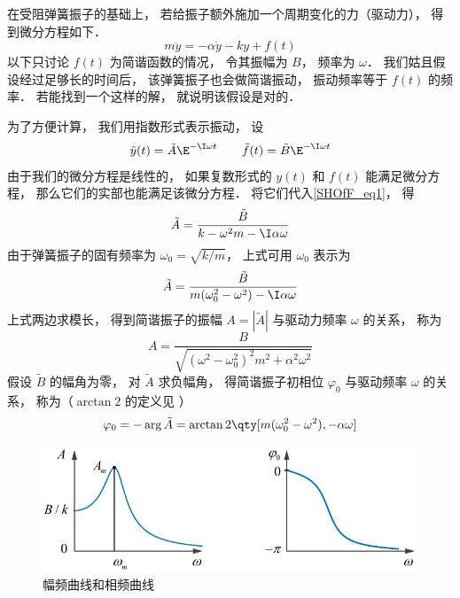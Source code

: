 

在受阻弹簧振子的基础上， 若给振子额外施加一个周期变化的力（驱动力）， 得到微分方程如下．
\begin{equation}\label{SHOfF_eq1}
m\ddot y = -\alpha \dot y - ky + f(t)
\end{equation}
以下只讨论 $f(t)$ 为简谐函数的情况， 令其振幅为 $B$， 频率为 $\omega$． 我们姑且假设经过足够长的时间后， 该弹簧振子也会做简谐振动， 振动频率等于 $f(t)$ 的频率． 若能找到一个这样的解， 就说明该假设是对的．

为了方便计算， 我们用指数形式表示振动， 设
\begin{equation}
\tilde y(t) = \tilde A\E^{-\I\omega t} \qquad
\tilde f(t) = \tilde B\E^{-\I \omega t}
\end{equation}
由于我们的微分方程是线性的， 如果复数形式的 $y(t)$ 和 $f(t)$ 能满足微分方程， 那么它们的实部也能满足该微分方程． 将它们代入\autoref{SHOfF_eq1}， 得
\begin{equation}
\tilde A =  \frac{\tilde B}{k -\omega^2 m - \I\alpha\omega}
\end{equation}
由于弹簧振子的固有频率为 $\omega_0 = \sqrt{k/m}$， 上式可用 $\omega_0$ 表示为
\begin{equation}
\tilde A = \frac{\tilde B}{m(\omega_0^2 - \omega^2) - \I\alpha\omega}
\end{equation}
上式两边求模长， 得到简谐振子的振幅 $A = |\tilde A|$ 与驱动力频率 $\omega$ 的关系， 称为
\begin{equation}\label{SHOfF_eq5}
A = \frac{B}{\sqrt{(\omega^2 - \omega_0^2)^2 m^2 + \alpha^2\omega^2}}
\end{equation}
假设 $\tilde B$ 的幅角为零， 对 $\tilde A$ 求负幅角， 得简谐振子初相位 $\varphi_0$ 与驱动频率 $\omega$ 的关系， 称为（$\arctan2$ 的定义见%
）
\begin{equation}\label{SHOfF_eq6}
\varphi_0 = -\arg \tilde A = \arctan2 \qty[m(\omega_0^2 - \omega^2), -\alpha\omega]
\end{equation}

\begin{figure}[ht]
\centering
\includegraphics[width=12cm]{./figures/SHOfF1.pdf}
\caption{幅频曲线和相频曲线} \label{SHOfF_fig1}
\end{figure}


